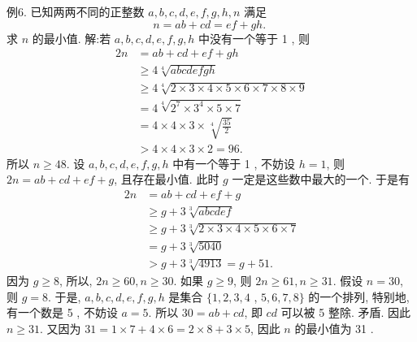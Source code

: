 例6. 已知两两不同的正整数 $a, b, c, d, e, f, g, h, n$ 满足
$$
n=a b+c d=e f+g h \text {. }
$$
求 $n$ 的最小值.
解:若 $a, b, c, d, e, f, g, h$ 中没有一个等于 1 , 则
$$
\begin{aligned}
2 n & =a b+c d+e f+g h \\
& \geqslant 4 \sqrt[4]{a b c d e f g h} \\
& \geqslant 4 \sqrt[4]{2 \times 3 \times 4 \times 5 \times 6 \times 7 \times 8 \times 9} \\
& =4 \sqrt[4]{2^7 \times 3^4 \times 5 \times 7} \\
& =4 \times 4 \times 3 \times \sqrt[4]{\frac{35}{2}} \\
& >4 \times 4 \times 3 \times 2=96 .
\end{aligned}
$$
所以 $n \geqslant 48$. 设 $a, b, c, d, e, f, g, h$ 中有一个等于 1 , 不妨设 $h=1$, 则 $2 n=a b+c d+e f+g$, 且存在最小值.
此时 $g$ 一定是这些数中最大的一个.
于是有
$$
\begin{aligned}
2 n & =a b+c d+e f+g \\
& \geqslant g+3 \sqrt[3]{a b c d e f} \\
& \geqslant g+3 \sqrt[3]{2 \times 3 \times 4 \times 5 \times 6 \times 7} \\
& =g+3 \sqrt[3]{5040} \\
& >g+3 \sqrt[3]{4913}=g+51 .
\end{aligned}
$$
因为 $g \geqslant 8$, 所以, $2 n \geqslant 60, n \geqslant 30$.
如果 $g \geqslant 9$, 则 $2 n \geqslant 61, n \geqslant 31$.
假设 $n=30$, 则 $g=8$. 于是, $a, b, c, d, e, f, g, h$ 是集合 $\{1,2,3,4$ , $5,6,7,8\}$ 的一个排列, 特别地, 有一个数是 5 , 不妨设 $a=5$. 所以 $30=a b+ c d$, 即 $c d$ 可以被 5 整除.
矛盾.
因此 $n \geqslant 31$. 又因为 $31=1 \times 7+4 \times 6=2 \times 8+3 \times 5$, 因此 $n$ 的最小值为 31 .



